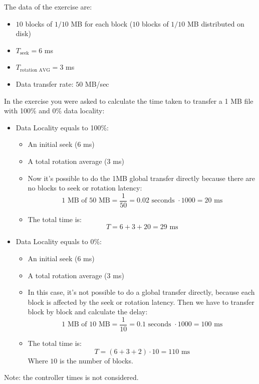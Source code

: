 \begin{exercisebox}
    The data of the exercise are:
    \begin{itemize}
        \item $10$ blocks of $1/10$ MB for each block ($10$ blocks of $1/10$ MB  distributed on disk)
        \item $T_{\text{seek}} = 6$ ms
        \item $T_{\text{rotation AVG}} = 3$ ms
        \item Data transfer rate: $50$ MB/sec
    \end{itemize}
    In the exercise you were asked to calculate the time taken to transfer a 1 MB file with 100\% and 0\% data locality:
    \begin{itemize}
        \item Data Locality equals to 100\%:
        \begin{itemize}
            \item An initial seek ($6$ ms)
            \item A total rotation average ($3$ ms)
            \item Now it's possible to do the 1MB global transfer directly because there are no blocks to seek or rotation latency:
            \begin{equation*}
                \text{1 MB of 50 MB} = \dfrac{1}{50} = 0.02 \text{ seconds } \cdot 1000 = 20 \text{ ms}
            \end{equation*}
            \item The total time is:
            \begin{equation*}
                T = 6 + 3 + 20 = 29 \text{ ms}
            \end{equation*}
        \end{itemize}

        \newpage
        \item Data Locality equals to 0\%:
        \begin{itemize}
            \item An initial seek ($6$ ms)
            \item A total rotation average ($3$ ms)
            \item In this case, it's not possible to do a global transfer directly, because each block is affected by the seek or rotation latency. Then we have to transfer block by block and calculate the delay:
            \begin{equation*}
                \text{1 MB of 10 MB} = \dfrac{1}{10} = 0.1 \text{ seconds } \cdot 1000 = 100 \text{ ms}
            \end{equation*}
            \item The total time is:
            \begin{equation*}
                T = \left(6 + 3 + 2\right) \cdot 10 = 110 \text{ ms}
            \end{equation*}
            Where $10$ is the number of blocks.
        \end{itemize}
    \end{itemize}
    Note: the controller times is not considered.
\end{exercisebox}
